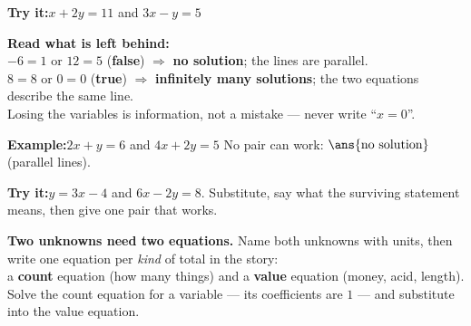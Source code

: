 \documentclass[12pt]{article}
\begin{document}
\begin{tryitbox}
\textbf{Try it:}\quad $x + 2y = 11$ \; and \; $3x - y = 5$\\[2pt]
\end{tryitbox}


\begin{formulabox}
\textbf{Read what is left behind:}\\[3pt]
$-6 = 1$ or $12 = 5$ (\textbf{false}) $\Rightarrow$ \textbf{no solution}; the
lines are parallel.\\
$8 = 8$ or $0 = 0$ (\textbf{true}) $\Rightarrow$ \textbf{infinitely many
solutions}; the two equations describe the same line.\\[3pt]
Losing the variables is information, not a mistake --- never write ``$x = 0$''.
\end{formulabox}

\begin{examplebox}
\textbf{Example:}\quad $2x + y = 6$ \; and \; $4x + 2y = 5$
No pair can work: $\ans{\text{no solution}}$ (parallel lines).
\end{examplebox}

\begin{tryitbox}
\textbf{Try it:}\quad $y = 3x - 4$ \; and \; $6x - 2y = 8$. Substitute, say what
the surviving statement means, then give one pair that works.\\[2pt]
\end{tryitbox}


\begin{formulabox}
\textbf{Two unknowns need two equations.} Name both unknowns with units, then
write one equation per \emph{kind} of total in the story:\\[3pt]
a \textbf{count} equation (how many things) and a \textbf{value} equation (money,
acid, length). Solve the count equation for a variable --- its coefficients are
$1$ --- and substitute into the value equation.
\end{formulabox}
\end{document}
